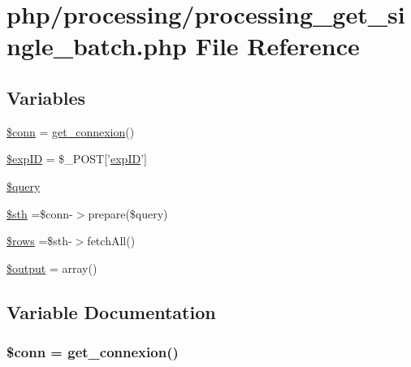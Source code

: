 \hypertarget{processing__get__single__batch_8php}{\section{php/processing/processing\-\_\-get\-\_\-single\-\_\-batch.php File Reference}
\label{processing__get__single__batch_8php}
}
\subsection*{Variables}
\begin{DoxyCompactItemize}
\item 
\hyperlink{processing__get__single__batch_8php_aa8a5a87b9c1a6a0819b88447cbe41877}{\$conn} = \hyperlink{php__functions_8php_ace18bc10f3fd08f92688ac743e0d8c2e}{get\-\_\-connexion}()
\item 
\hyperlink{processing__get__single__batch_8php_ae384d32e62e85e587cd27bf249ed3db3}{\$exp\-I\-D} = \$\-\_\-\-P\-O\-S\-T\mbox{[}'\hyperlink{admin_rawdata_8php_a888d53a6517f4272b5982c3ca9d16e8a}{exp\-I\-D}'\mbox{]}
\item 
\hyperlink{processing__get__single__batch_8php_af59a5f7cd609e592c41dc3643efd3c98}{\$query}
\item 
\hyperlink{processing__get__single__batch_8php_afa9126f9664959c02795be300a135f93}{\$sth} =\$conn-\/$>$prepare(\$query)
\item 
\hyperlink{processing__get__single__batch_8php_ace2ec39e7df3899fa8df9640ec274b03}{\$rows} =\$sth-\/$>$fetch\-All()
\item 
\hyperlink{processing__get__single__batch_8php_a73004ce9cd673c1bfafd1dc351134797}{\$output} = array()
\end{DoxyCompactItemize}


\subsection{Variable Documentation}
\hypertarget{processing__get__single__batch_8php_aa8a5a87b9c1a6a0819b88447cbe41877}{
\subsubsection[{\$conn}]{\setlength{\rightskip}{0pt plus 5cm}\$conn = {\bf get\-\_\-connexion}()}}\label{processing__get__single__batch_8php_aa8a5a87b9c1a6a0819b88447cbe41877}


